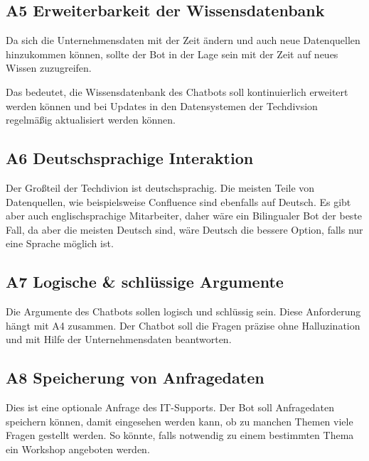\subsection{A5 Erweiterbarkeit der Wissensdatenbank}
\label{s:anf:a5}
Da sich die Unternehmensdaten mit der Zeit ändern und auch neue 
Datenquellen hinzukommen können, sollte der Bot in der Lage sein 
mit der Zeit auf neues Wissen zuzugreifen.\par
Das bedeutet, die Wissensdatenbank des Chatbots soll kontinuierlich 
erweitert werden können und bei Updates in den Datensystemen der Techdivsion
regelmäßig aktualisiert werden können.
\subsection{A6 Deutschsprachige Interaktion}
\label{s:anf:a6}
Der Großteil der Techdivion ist deutschsprachig. Die meisten Teile von 
Datenquellen, wie beispielsweise Confluence sind ebenfalls auf Deutsch. 
Es gibt aber auch englischsprachige Mitarbeiter, daher wäre ein Bilingualer 
Bot der beste Fall, da aber die meisten Deutsch sind, wäre Deutsch die bessere
Option, falls nur eine Sprache möglich ist.
\subsection{A7 Logische \& schlüssige Argumente}
\label{s:anf:a7}
Die Argumente des Chatbots sollen logisch und schlüssig sein. 
Diese Anforderung hängt mit A4 zusammen. Der
Chatbot soll die Fragen präzise ohne Halluzination und
mit Hilfe der Unternehmensdaten beantworten.
\subsection{A8 Speicherung von Anfragedaten}
\label{s:anf:a8}
Dies ist eine optionale Anfrage des IT-Supports.
Der Bot soll Anfragedaten speichern können, damit eingesehen werden kann,
ob zu manchen Themen viele Fragen gestellt werden. 
So könnte, falls notwendig zu einem bestimmten
Thema ein Workshop angeboten werden.


